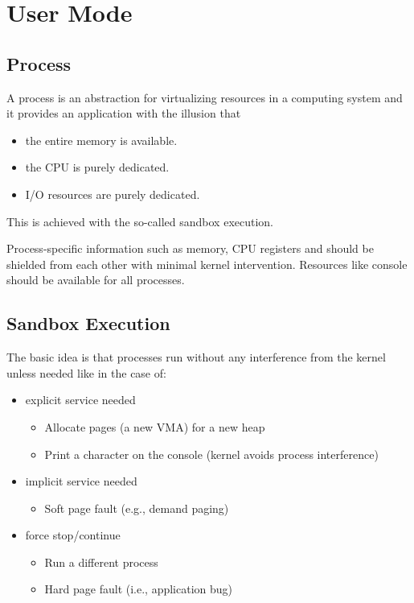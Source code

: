 \section{User Mode}

\subsection{Process}

A process is an abstraction for virtualizing resources in a computing system and it provides an application with the illusion that
\begin{itemize}
    \item the entire memory is available.
    \item the CPU is purely dedicated.
    \item I/O resources are purely dedicated.
\end{itemize}
This is achieved with the so-called sandbox execution.

\newpar{}

Process-specific information such as memory, CPU registers and should be shielded from each other with minimal kernel intervention. Resources like console should be available for all processes.

\subsection{Sandbox Execution}
The basic idea is that processes run without any interference from the kernel unless needed like in the case of:
\begin{itemize}
    \item explicit service needed
          \begin{itemize}
              \item Allocate pages (a new VMA) for a new heap
              \item Print a character on the console (kernel avoids process interference)
          \end{itemize}
    \item implicit service needed
          \begin{itemize}
              \item Soft page fault (e.g., demand paging)
          \end{itemize}
    \item force stop/continue
          \begin{itemize}
              \item Run a different process
              \item Hard page fault (i.e., application bug)
          \end{itemize}
\end{itemize}

